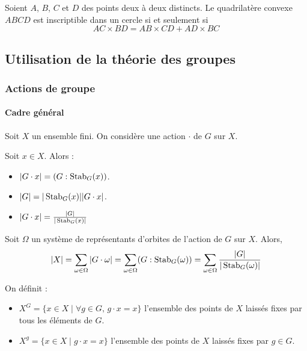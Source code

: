 	\begin{corollary}
		Soient $A$, $B$, $C$ et $D$ des points deux à deux distincts. Le quadrilatère convexe $ABCD$ est inscriptible dans un cercle si et seulement si
		\[ AC \times BD = AB \times CD + AD \times BC \]
	\end{corollary}
	
	\subsection{Utilisation de la théorie des groupes}
	
	\subsubsection{Actions de groupe}
	
	\paragraph{Cadre général}
	
	
	Soit $X$ un ensemble fini. On considère une action $\cdot$ de $G$ sur $X$.
	
	\begin{proposition}
		Soit $x \in X$. Alors :
		\begin{itemize}
			\item $|G \cdot x| = (G : \operatorname{Stab}_G(x))$.
			\item $|G| = |\operatorname{Stab}_G(x)| |G \cdot x|$.
			\item $|G \cdot x| = \frac{|G|}{|\operatorname{Stab}_G(x)|}$
		\end{itemize}
	\end{proposition}
	
	\begin{theorem}
		Soit $\Omega$ un système de représentants d'orbites de l'action de $G$ sur $X$. Alors,
		\[ |X| = \sum_{\omega \in \Omega} |G \cdot \omega| = \sum_{\omega \in \Omega} (G : \operatorname{Stab}_G(\omega)) = \sum_{\omega \in \Omega} \frac{|G|}{|\operatorname{Stab}_G(\omega)|} \]
	\end{theorem}
	
	\begin{definition}
		On définit :
		\begin{itemize}
			\item $X^G = \{ x \in X \mid \forall g \in G, \, g \cdot x = x \}$ l'ensemble des points de $X$ laissés fixes par tous les éléments de $G$.
			\item $X^g = \{ x \in X \mid g \cdot x = x \}$ l'ensemble des points de $X$ laissés fixes par $g \in G$.
		\end{itemize}
	\end{definition}
	
